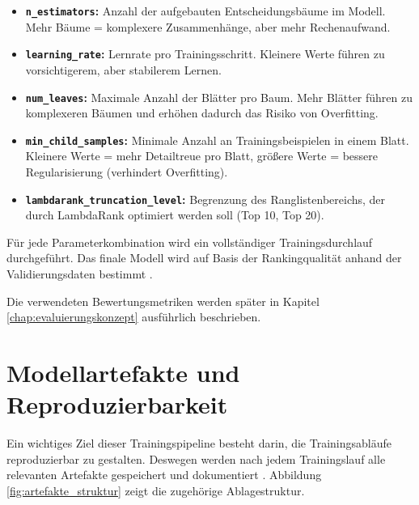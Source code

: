 \begin{itemize}
    \item \textbf{\texttt{n\_estimators}:} Anzahl der aufgebauten Entscheidungsbäume im Modell. Mehr Bäume = komplexere Zusammenhänge, aber mehr Rechenaufwand.
    \item \textbf{\texttt{learning\_rate}:} Lernrate pro Trainingsschritt. Kleinere Werte führen zu vorsichtigerem, aber stabilerem Lernen.
    \item \textbf{\texttt{num\_leaves}:} Maximale Anzahl der Blätter pro Baum. Mehr Blätter führen zu komplexeren Bäumen und erhöhen dadurch das Risiko von Overfitting. 
    \item \textbf{\texttt{min\_child\_samples}:} Minimale Anzahl an Trainingsbeispielen in einem Blatt. Kleinere Werte = mehr Detailtreue pro Blatt, größere Werte = bessere Regularisierung (verhindert Overfitting).
    \item \textbf{\texttt{lambdarank\_\allowbreak truncation\_level}:} Begrenzung des Ranglistenbereichs, der durch LambdaRank optimiert werden soll (Top 10, Top 20).
\end{itemize}

Für jede Parameterkombination wird ein vollständiger Trainingsdurchlauf durchgeführt.
Das finale Modell wird auf Basis der Rankingqualität anhand der Validierungsdaten bestimmt \parencite{srcStep931}.

Die verwendeten Bewertungsmetriken werden später in Kapitel \ref{chap:evaluierungskonzept} ausführlich beschrieben.

\section{Modellartefakte und Reproduzierbarkeit}

Ein wichtiges Ziel dieser Trainingspipeline besteht darin, die Trainingsabläufe reproduzierbar zu gestalten. Deswegen werden nach jedem Trainingslauf alle relevanten Artefakte gespeichert und dokumentiert \parencite{srcStep931}. Abbildung \ref{fig:artefakte_struktur} zeigt die zugehörige Ablagestruktur.

